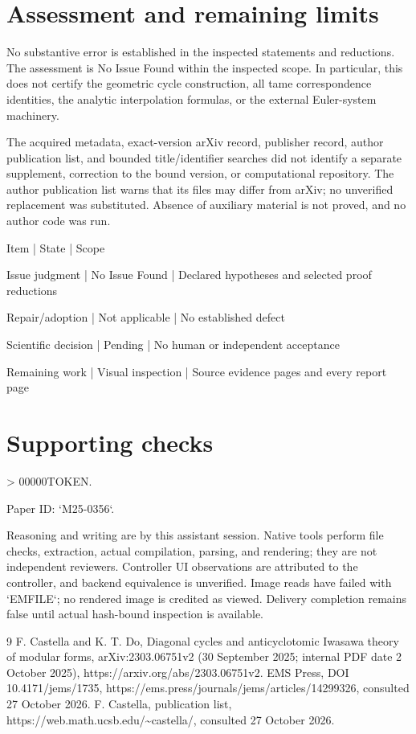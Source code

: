 \documentclass[10pt]{article}
\begin{document}
\section*{Assessment and remaining limits}
No substantive error is established in the inspected statements and reductions. The assessment is No Issue Found within the inspected scope. In particular, this does not certify the geometric cycle construction, all tame correspondence identities, the analytic interpolation formulas, or the external Euler-system machinery.\par
The acquired metadata, exact-version arXiv record, publisher record, author publication list, and bounded title/identifier searches did not identify a separate supplement, correction to the bound version, or computational repository. The author publication list warns that its files may differ from arXiv; no unverified replacement was substituted. Absence of auxiliary material is not proved, and no author code was run.\par
Item | State | Scope\par
Issue judgment | No Issue Found | Declared hypotheses and selected proof reductions\par
Repair/adoption | Not applicable | No established defect\par
Scientific decision | Pending | No human or independent acceptance\par
Remaining work | Visual inspection | Source evidence pages and every report page\par
\section*{Supporting checks}
> 00000TOKEN.\par
Paper ID: `M25-0356`.\par
Reasoning and writing are by this assistant session. Native tools perform file checks, extraction, actual compilation, parsing, and rendering; they are not independent reviewers. Controller UI observations are attributed to the controller, and backend equivalence is unverified. Image reads have failed with `EMFILE`; no rendered image is credited as viewed. Delivery completion remains false until actual hash-bound inspection is available.\par
9 F. Castella and K. T. Do, Diagonal cycles and anticyclotomic Iwasawa theory of modular forms, arXiv:2303.06751v2 (30 September 2025; internal PDF date 2 October 2025), https://arxiv.org/abs/2303.06751v2. EMS Press, DOI 10.4171/jems/1735, https://ems.press/journals/jems/articles/14299326, consulted 27 October 2026. F. Castella, publication list, https://web.math.ucsb.edu/\textasciitilde{}castella/, consulted 27 October 2026.\par
\end{document}
